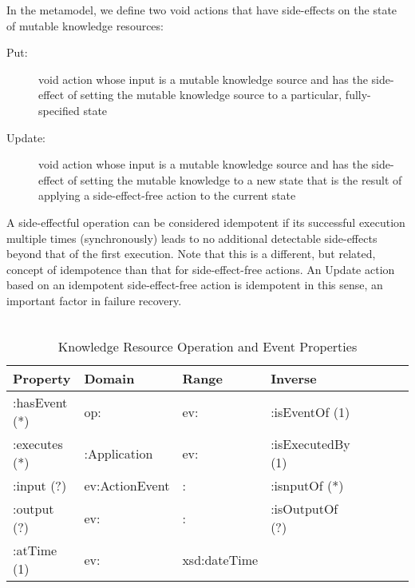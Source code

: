 \documentclass[runningheads]{llncs}
\begin{document}
In the metamodel, we define two void actions that have side-effects on the state of mutable knowledge resources:
  \begin{description}
    \item[Put:] void action whose input is a mutable knowledge source and has the side-effect of setting the mutable knowledge source to a particular, fully-specified state
    \item[Update:] void action whose input is a mutable knowledge source and has the side-effect of setting the mutable knowledge to a new state that is the result of applying a side-effect-free action to the current state
  \end{description}
  
  A side-effectful operation can be considered idempotent if its successful execution multiple times (synchronously) leads to no additional detectable side-effects beyond that of the first execution. Note that this is a different, but related, concept of idempotence than that for side-effect-free actions. An Update action based on an idempotent side-effect-free action is idempotent in this sense, an important factor in failure recovery.\\
\\
\begin{table}[h]
\centering
\begin{tabular}{|l|l|l|l|l|l|l|l|}
\hline
\textbf{Property}  &\textbf{Domain}  & \textbf{Range}  & \textbf{Inverse}
\\ \hline
:hasEvent (*)      & op:               & ev:             & :isEventOf  (1)         \\ \hline
:executes (*)      & :Application      & ev:             & :isExecutedBy  (1)         \\ \hline
:input (?)         & ev:ActionEvent    &    :          & :isnputOf  (*)         \\ \hline
:output (?)        & ev:               &    :          & :isOutputOf  (?)         \\ \hline
:atTime (1)        & ev:               &    xsd:dateTime          &          \\ \hline
\end{tabular}
\caption{Knowledge Resource Operation and Event Properties}
\vspace{-0.3cm}
\label{kropprop}
\end{table}

\vspace{-0.8cm}
\end{document}
